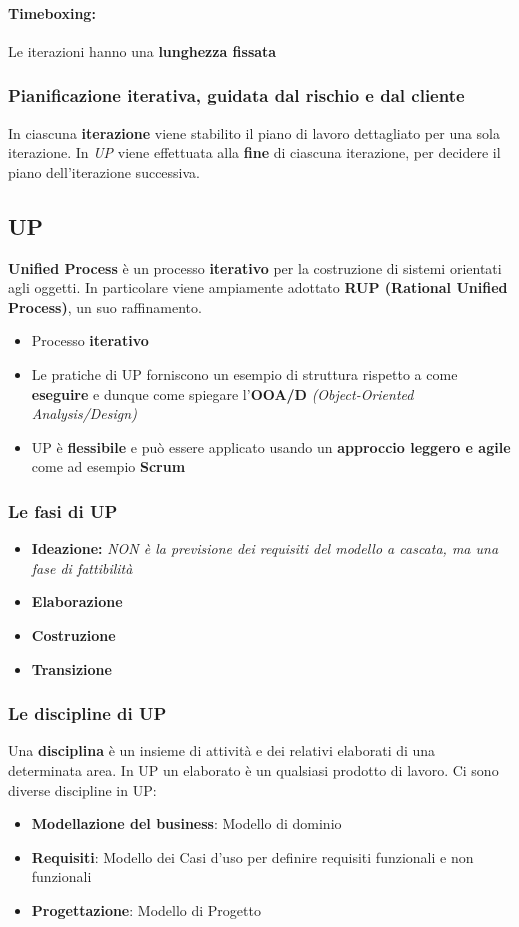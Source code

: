 \documentclass[12pt]{article}
\begin{document}
\paragraph{Timeboxing:} Le iterazioni hanno una \textbf{lunghezza fissata}
\subsubsection{Pianificazione iterativa, guidata dal rischio e dal cliente}
In ciascuna \textbf{iterazione} viene stabilito il piano di lavoro dettagliato per una sola iterazione. In \textit{UP} viene effettuata alla \textbf{fine} di ciascuna iterazione, per decidere il piano dell'iterazione successiva.
\subsection{UP}
\textbf{Unified Process} è un processo \textbf{iterativo} per la costruzione di sistemi orientati agli oggetti. In particolare viene ampiamente adottato \textbf{RUP (Rational Unified Process)}, un suo raffinamento.
\begin{itemize}
    \item Processo \textbf{iterativo}
    \item Le pratiche di UP forniscono un esempio di struttura rispetto a come \textbf{eseguire} e dunque come spiegare l'\textbf{OOA/D} \textit{(Object-Oriented Analysis/Design)}
    \item UP è \textbf{flessibile} e può essere applicato usando un \textbf{approccio leggero e agile} come ad esempio \textbf{Scrum}
\end{itemize}
\subsubsection{Le fasi di UP}
\begin{itemize}
    \item \textbf{Ideazione:} \textit{NON è la previsione dei requisiti del modello a cascata, ma una fase di fattibilità}
    \item \textbf{Elaborazione}
    \item \textbf{Costruzione}
    \item \textbf{Transizione}
\end{itemize}
\subsubsection{Le discipline di UP}
Una \textbf{disciplina} è un insieme di attività e dei relativi elaborati di una determinata area. In UP un elaborato è un qualsiasi prodotto di lavoro. Ci sono diverse discipline in UP:
\begin{itemize}
    \item \textbf{Modellazione del business}: Modello di dominio
    \item \textbf{Requisiti}: Modello dei Casi d'uso per definire requisiti funzionali e non funzionali
    \item \textbf{Progettazione}: Modello di Progetto
\end{itemize}
\end{document}
